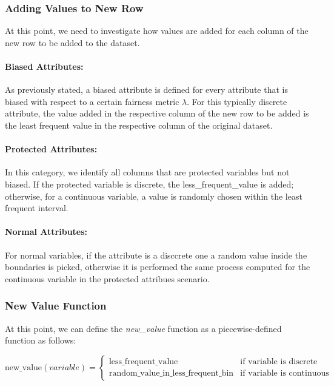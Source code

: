 \documentclass[12pt,a4paper,openright,twoside]{book}
\begin{document}
\subsubsection{Adding Values to New Row}
At this point, we need to investigate how values are added for each column of the new row to be added to the dataset.

\paragraph{Biased Attributes:}
As previously stated, a biased attribute is defined for every attribute that is biased with respect to a certain fairness metric \( \lambda \). For this typically discrete attribute, the value added in the respective column of the new row to be added is the least frequent value in the respective column of the original dataset.

\paragraph{Protected Attributes:}
In this category, we identify all columns that are protected variables but not biased. If the protected variable is discrete, the less\_frequent\_value is added; otherwise, for a continuous variable, a value is randomly chosen within the least frequent interval.

\paragraph{Normal Attributes:}
For normal variables, if the attribute is a disccrete one a random value inside the boundaries is picked, otherwise it is performed the same process computed for the continuous variable in the protected attribues scenario.

\subsubsection{New Value Function}
At this point, we can define the \textit{new\_value} function as a piecewise-defined function as follows:

\[
\text{new\_value}(variable) = 
\begin{cases} 
      \text{less\_frequent\_value} & \text{if } \text{variable} \text{ is discrete} \\
      \text{random\_value\_in\_less\_frequent\_bin} & \text{if } \text{variable} \text{ is  continuous}
\end{cases}
\]
\end{document}
